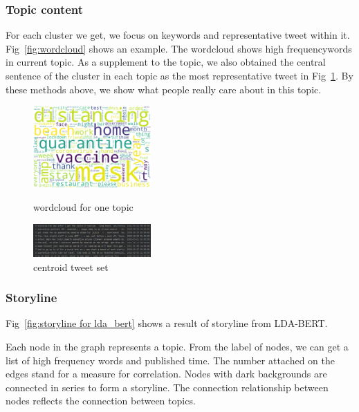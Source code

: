 \subsubsection{Topic content}
For each cluster we get, we focus on keywords and representative tweet within it. Fig~\ref{fig:wordcloud} shows an example. The wordcloud shows high frequencywords in current topic. As a supplement to the topic, we also obtained the central sentence of the cluster in each topic as the most representative tweet in Fig~\ref{fig:center_sentence}. By these methods above, we show what people really care about in this topic.
\begin{figure}
\centering
{
\includegraphics[width=0.4\textwidth]{imgs/lda_bert/Topic0_wordcloud.png}
\caption{wordcloud for one topic}
\label{fig:wordcloud}
}
\hspace{10pt}    
{
\includegraphics[width=0.4\textwidth]{imgs/lda_bert/center_sentence.png}
\caption{centroid tweet set}
\label{fig:center_sentence}
}
\hspace{10pt}
\end{figure}


\subsubsection{Storyline}
Fig~\ref{fig:storyline for lda_bert} shows a result of storyline from LDA-BERT.  

Each node in the graph represents a topic. From the label of nodes, we can get a list of high frequency words and published time. The number attached on the edges stand for a measure for correlation. Nodes with dark backgrounds are connected in series to form a storyline. The connection relationship between nodes reflects the connection between topics.

